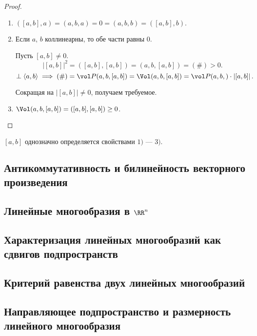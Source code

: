 \begin{proof}~
    \begin{enumerate}
    \item $([a, b], a) = (a, b, a) = 0 = (a, b, b) = ([a, b], b)$.
    \item Если $a$, $b$ коллинеарны, то обе части равны 0.

        Пусть $[a, b] \neq 0$.
        \begin{equation*}
            \left|[a, b]\right|^2 = ([a, b], [a, b]) = (a, b, [a, b]) = (\#) > 0
        .\end{equation*}
        \begin{equation*}
            [a, b] \perp \left< a, b \right> \implies (\#) = \vol P(a, b, [a, b]) = \Vol(a, b, [a, b]) = \vol P(a, b,) \cdot \left|[a, b]\right|
        .\end{equation*}

        Сокращая на $|[a, b]| \neq 0$, получаем требуемое.

    \item
        $\Vol (a, b, [a, b]) = ([a, b], [a, b]) \geq 0$.
        \qedhere
    \end{enumerate}
\end{proof}

\begin{exercise}
    $[a, b]$ однозначно определяется свойствами $1)$ --- $3)$.
\end{exercise}

\subsection{Антикоммутативность и билинейность векторного произведения}
\subsection{Линейные многообразия в $\RR^n$}
\subsection{Характеризация линейных многообразий как сдвигов подпространств}
\subsection{Критерий равенства двух линейных многообразий}
\subsection{Направляющее подпространство и размерность линейного многообразия}
 
